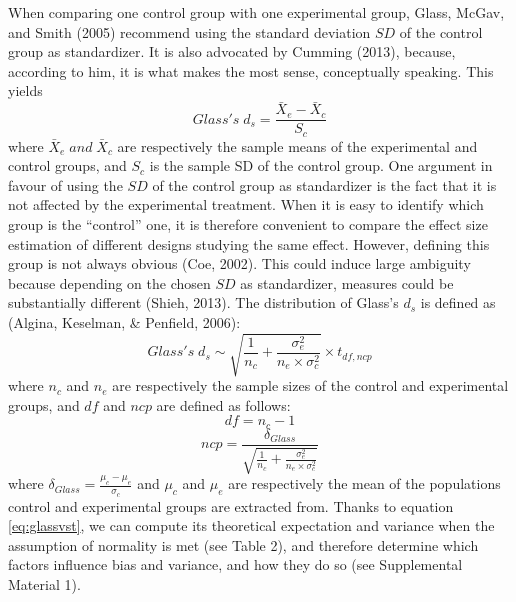 \documentclass[
  english,
  man,floatsintext]{apa6}
\begin{document}
When comparing one control group with one experimental group, Glass, McGav, and Smith (2005) recommend using the standard deviation \(SD\) of the control group as standardizer. It is also advocated by Cumming (2013), because, according to him, it is what makes the most sense, conceptually speaking. This yields
\begin{equation*} 
Glass's \; d_s = \frac{\bar{X}_{e} - \bar{X}_{c}}{S_{c}}
\label{eq:Glassds}
\end{equation*}
where \(\bar{X}_{e} \; and \; \bar{X}_{c}\) are respectively the sample means of the experimental and control groups, and \(S_{c}\) is the sample SD of the control group. One argument in favour of using the \(SD\) of the control group as standardizer is the fact that it is not affected by the experimental treatment. When it is easy to identify which group is the \enquote{control} one, it is therefore convenient to compare the effect size estimation of different designs studying the same effect. However, defining this group is not always obvious (Coe, 2002). This could induce large ambiguity because depending on the chosen \(SD\) as standardizer, measures could be substantially diﬀerent (Shieh, 2013). The distribution of Glass's \(d_{s}\) is defined as (Algina, Keselman, \& Penfield, 2006):
\begin{equation} 
Glass's \; d_s \sim \sqrt{\frac{1}{n_{c}}+\frac{\sigma_{e}^2}{n_{e} \times \sigma^2_{c}}} \times t_{df,ncp}
\label{eq:glassvst}
\end{equation}
where \(n_c\) and \(n_e\) are respectively the sample sizes of the control and experimental groups, and \(df\) and \(ncp\) are defined as follows:
\begin{equation} 
df = n_{c}-1
\label{eq:glassdf}
\end{equation}
\begin{equation*} 
ncp = \frac{\delta_{Glass}}{\sqrt{\frac{1}{n_{c}} + \frac{\sigma_{e}^2}{n_{e} \times \sigma^2_{c}}}}
\label{eq:glassncp}
\end{equation*}
where \(\delta_{Glass} = \frac{\mu_{c}-\mu_{e}}{\sigma_{c}}\) and \(\mu_c\) and \(\mu_e\) are respectively the mean of the populations control and experimental groups are extracted from. Thanks to equation \ref{eq:glassvst}, we can compute its theoretical expectation and variance when the assumption of normality is met (see Table 2), and therefore determine which factors influence bias and variance, and how they do so (see Supplemental Material 1).
\end{document}

